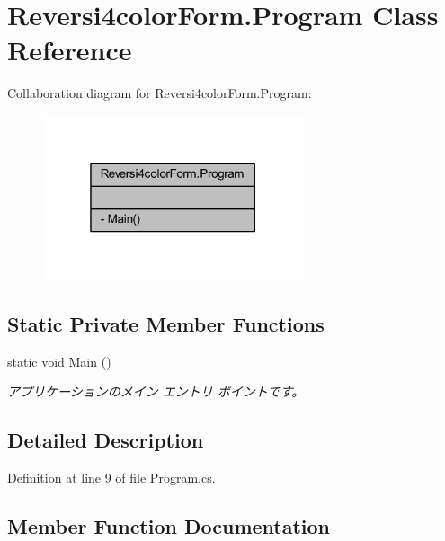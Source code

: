 \hypertarget{class_reversi4color_form_1_1_program}{}\section{Reversi4color\+Form.\+Program Class Reference}
\label{class_reversi4color_form_1_1_program}


Collaboration diagram for Reversi4color\+Form.\+Program\+:
\nopagebreak
\begin{figure}[H]
\begin{center}
\leavevmode
\includegraphics[width=217pt]{class_reversi4color_form_1_1_program__coll__graph}
\end{center}
\end{figure}
\subsection*{Static Private Member Functions}
\begin{DoxyCompactItemize}
\item 
static void \hyperlink{class_reversi4color_form_1_1_program_a2edae1f309199d01d6561ca9f1b09454}{Main} ()
\begin{DoxyCompactList}\small\item\em アプリケーションのメイン エントリ ポイントです。 \end{DoxyCompactList}\end{DoxyCompactItemize}


\subsection{Detailed Description}


Definition at line 9 of file Program.\+cs.



\subsection{Member Function Documentation}
\mbox{\label{class_reversi4color_form_1_1_program_a2edae1f309199d01d6561ca9f1b09454}} 
